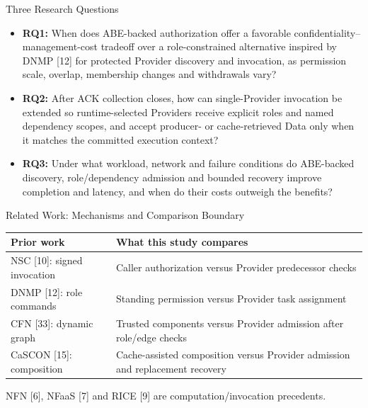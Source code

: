 \begin{frame}{Three Research Questions}
\small
\begin{itemize}
\item \textbf{RQ1:} When does ABE-backed authorization offer a favorable confidentiality--management-cost tradeoff over a role-constrained alternative inspired by DNMP [12] for protected Provider discovery and invocation, as permission scale, overlap, membership changes and withdrawals vary?
\item \textbf{RQ2:} After ACK collection closes, how can single-Provider invocation be extended so runtime-selected Providers receive explicit roles and named dependency scopes, and accept producer- or cache-retrieved Data only when it matches the committed execution context?
\item \textbf{RQ3:} Under what workload, network and failure conditions do ABE-backed discovery, role/dependency admission and bounded recovery improve completion and latency, and when do their costs outweigh the benefits?
\end{itemize}
\vspace{3mm}
\end{frame}

\begin{frame}{Related Work: Mechanisms and Comparison Boundary}
\small
\begin{tabularx}{\linewidth}{>{\raggedright\arraybackslash}p{.27\linewidth}>{\raggedright\arraybackslash}X}
\toprule Prior work & What this study compares\\\midrule
NSC [10]: signed invocation & Caller authorization versus Provider predecessor checks\\\midrule
DNMP [12]: role commands & Standing permission versus Provider task assignment\\\midrule
CFN [33]: dynamic graph & Trusted components versus Provider admission after role/edge checks\\\midrule
CaSCON [15]: composition & Cache-assisted composition versus Provider admission and replacement recovery\\\bottomrule
\end{tabularx}
\vspace{1mm}\small NFN [6], NFaaS [7] and RICE [9] are computation/invocation precedents.
\vspace{1mm}
\end{frame}

